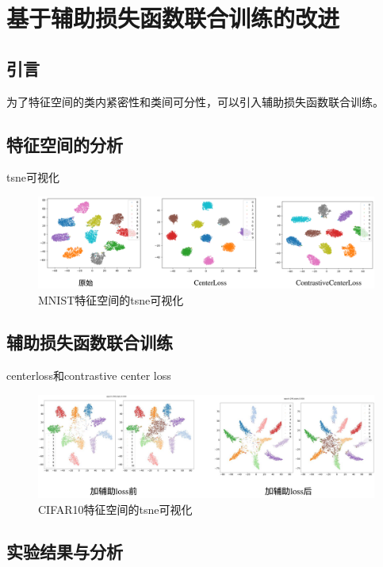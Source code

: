 

\chapter{基于辅助损失函数联合训练的改进}
\section{引言}
为了特征空间的类内紧密性和类间可分性，可以引入辅助损失函数联合训练。
\section{特征空间的分析}
tsne可视化
\begin{figure}[H]
    \centering
    \includegraphics[width=0.8\linewidth]{assets/4-1.png}
    \caption{MNIST特征空间的tsne可视化}
    \label{fig:enter-label}
\end{figure}
\section{辅助损失函数联合训练}
centerloss和contrastive center loss

\begin{figure}[H]
    \centering
    \includegraphics[width=0.8\linewidth]{assets/4-2.png}
    \caption{CIFAR10特征空间的tsne可视化}
    \label{fig:enter-label}
\end{figure}

\section{实验结果与分析}
